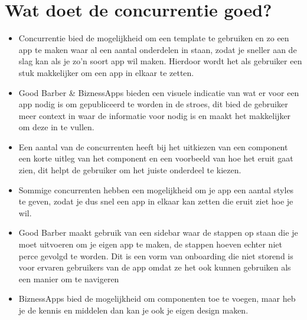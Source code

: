 \section{Wat doet de concurrentie goed?} 
\begin{itemize}
	\item Concurrentie bied de mogelijkheid om een template te gebruiken en zo een app te maken waar al een aantal onderdelen in staan, zodat je sneller aan de slag kan als je zo’n soort app wil maken. Hierdoor wordt het als gebruiker een stuk makkelijker om een app in elkaar te zetten.
	
	\item Good Barber \& BiznessApps bieden een visuele indicatie van wat er voor een app nodig is om gepubliceerd te worden in de stroes, dit bied de gebruiker meer context in waar de informatie voor nodig is en maakt het makkelijker om deze in te vullen.
	
	\item Een aantal van de concurrenten heeft bij het uitkiezen van een component een korte uitleg van het component en een voorbeeld van hoe het eruit gaat zien, dit helpt de gebruiker om het juiste onderdeel te kiezen.
	
	\item Sommige concurrenten hebben een mogelijkheid om je app een aantal styles te geven, zodat je dus snel een app in elkaar kan zetten die eruit ziet hoe je wil.
	
	\item Good Barber maakt gebruik van een sidebar waar de stappen op staan die je moet uitvoeren om je eigen app te maken, de stappen hoeven echter niet perce gevolgd te worden. Dit is een vorm van onboarding die niet storend is voor ervaren gebruikers van de app omdat ze het ook kunnen gebruiken als een manier om te navigeren
	
	\item BiznessApps bied de mogelijkheid om componenten toe te voegen, maar heb je de kennis en middelen dan kan je ook je eigen design maken.
\end{itemize}
